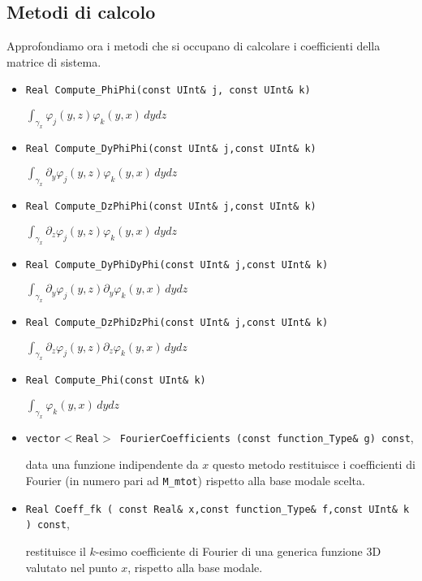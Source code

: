 \subsection{Metodi di calcolo}
Approfondiamo ora i metodi che si occupano di calcolare i coefficienti della matrice di sistema.

\begin{itemize}
\item \texttt{Real Compute\_PhiPhi(const UInt\& j, const UInt\& k)}

 $\int_{\gamma_x}\varphi_j(y,z)\varphi_k(y,x) \,dydz$

\item \texttt{Real Compute\_DyPhiPhi(const UInt\& j,const UInt\& k)} 

$\int_{\gamma_x} \partial_y \varphi_j(y,z)\varphi_k(y,x) \,dydz$

\item \texttt{Real Compute\_DzPhiPhi(const UInt\& j,const UInt\& k)} 

$\int_{\gamma_x} \partial_z \varphi_j(y,z)\varphi_k(y,x) \,dydz$

\item \texttt{Real Compute\_DyPhiDyPhi(const UInt\& j,const UInt\& k)} 

$\int_{\gamma_x} \partial_y \varphi_j(y,z)\partial_y\varphi_k(y,x) \,dydz$

\item \texttt{Real Compute\_DzPhiDzPhi(const UInt\& j,const UInt\& k)} 

$\int_{\gamma_x} \partial_z \varphi_j(y,z)\partial_z\varphi_k(y,x) \,dydz$

\item \texttt{Real Compute\_Phi(const UInt\& k)} 

$\int_{\gamma_x} \varphi_k(y,x) \,dydz$

\item \texttt{vector$<$Real$>$ FourierCoefficients (const function\_Type\& g) const},

data una funzione indipendente da $x$ questo metodo restituisce i coefficienti di Fourier (in numero pari ad \texttt{M\_mtot}) rispetto alla base modale scelta.

\item \texttt{Real Coeff\_fk (	const Real\& x,const function\_Type\& f,const UInt\& k ) const},

restituisce il $k$-esimo coefficiente di Fourier di una generica funzione 3D valutato nel punto $x$, rispetto alla base modale.
\end{itemize}

